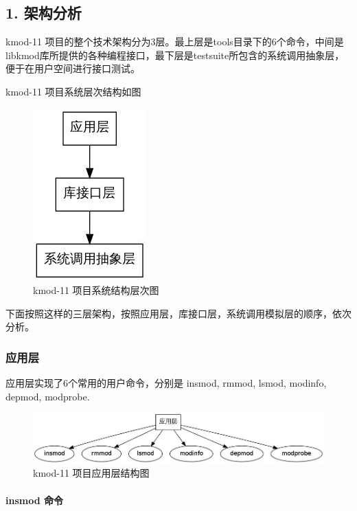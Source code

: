 \documentclass[11pt,a4paper]{article}
\makeatletter
\def\maxwidth{\ifdim\Gin@nat@width>\linewidth\linewidth
\else\Gin@nat@width\fi}
\let\Oldincludegraphics\includegraphics
\renewcommand{\includegraphics}[1]{\Oldincludegraphics[width=\maxwidth]{#1}}
\makeatother
\begin{document}
\subsection{1. 架构分析}

kmod-11
项目的整个技术架构分为3层。最上层是tools目录下的6个命令，中间是libkmod库所提供的各种编程接口，最下层是testsuite所包含的系统调用抽象层，便于在用户空间进行接口测试。

kmod-11 项目系统层次结构如图

\begin{figure}[htbp]
\centering
\includegraphics{./figures/0-overview.jpg}
\caption{kmod-11 项目系统结构层次图}
\end{figure}

下面按照这样的三层架构，按照应用层，库接口层，系统调用模拟层的顺序，依次分析。

\subsubsection{应用层}

应用层实现了6个常用的用户命令，分别是 insmod, rmmod, lsmod, modinfo,
depmod, modprobe.

\begin{figure}[htbp]
\centering
\includegraphics{./figures/1-app.jpg}
\caption{kmod-11 项目应用层结构图}
\end{figure}

\paragraph{insmod 命令}
\end{document}
